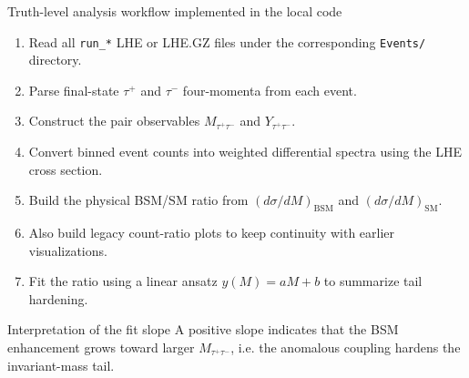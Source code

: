 \documentclass[aspectratio=1610,english]{beamer}
\newcommand{\Mtt}{\ensuremath{M_{\tau^+\tau^-}}}
\newcommand{\Ytt}{\ensuremath{Y_{\tau^+\tau^-}}}
\begin{document}
\begin{frame}{Truth-level analysis workflow implemented in the local code}
\begin{enumerate}
 \justifying
    \item Read all \texttt{run\_*} LHE or LHE.GZ files under the corresponding \texttt{Events/} directory.
    \item Parse final-state \(\tau^+\) and \(\tau^-\) four-momenta from each event.
    \item Construct the pair observables \(\Mtt\) and \(\Ytt\).
    \item Convert binned event counts into weighted differential spectra using the LHE cross section.
    \item Build the physical BSM/SM ratio from \((d\sigma/dM)_{\mathrm{BSM}}\) and \((d\sigma/dM)_{\mathrm{SM}}\).
    \item Also build legacy count-ratio plots to keep continuity with earlier visualizations.
    \item Fit the ratio using a linear ansatz \(y(M)=aM+b\) to summarize tail hardening.
\end{enumerate}
\begin{block}{Interpretation of the fit slope}
 \justifying
\small A positive slope indicates that the BSM enhancement grows toward larger \(\Mtt\), i.e. the anomalous coupling hardens the invariant-mass tail.
\end{block}
\end{frame}
\end{document}
